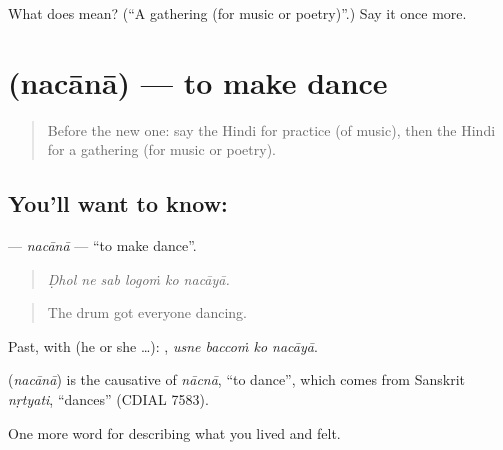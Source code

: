 \begin{tcolorbox}[breakable,colback=teal!4,colframe=teal!35!black,title={Before you move on}]
What does  mean? (\textquotedblleft{}A gathering (for music or poetry)\textquotedblright{}.) Say it once more.
\end{tcolorbox}
\section[\texorpdfstring{\hi{नचाना} (nacānā)}{नचाना (nacānā)}]{ (nacānā) — to make dance}

\label{lesson:HI-C532-nacana}



\begin{quote}
Before the new one: say the Hindi for practice (of music), then the Hindi for a gathering (for music or poetry).
\end{quote}

\subsection*{You'll want to know: }
\textbf{} — \emph{nacānā} — \textquotedblleft{}to make dance\textquotedblright{}.

\begin{quote}
     
\end{quote}

\begin{quote}
\emph{Ḍhol ne sab logoṁ ko nacāyā.}
\end{quote}

\begin{quote}
The drum got everyone dancing.
\end{quote}

Past, with  (he or she …):    , \emph{usne baccoṁ ko nacāyā}.

\begin{cousinweb}
\textbf{} (\emph{nacānā}) is the causative of \emph{nācnā}, \textquotedblleft{}to dance\textquotedblright{}, which comes from Sanskrit \emph{nṛtyati}, \textquotedblleft{}dances\textquotedblright{} (CDIAL 7583).
\end{cousinweb}

\begin{grammarlens}[title={What you've built}]
One more word for describing what you lived and felt.
\end{grammarlens}

